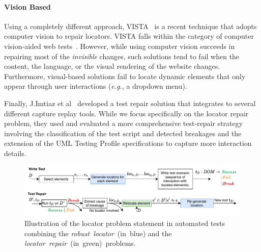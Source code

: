 \documentclass[preprint, 12pt]{elsarticle}
\begin{document}
\paragraph{Vision Based}
Using a completely different approach, VISTA~\cite{stocco2018visual} is a recent technique that adopts computer vision to repair locators. VISTA falls within the category of computer vision-aided web tests~\cite{chang2010gui,leotta2018pesto,alegroth2013jautomate}.
However, while using computer vision succeeds in repairing most of the \textit{invisible} changes, such solutions tend to fail when the content, the language, or the visual rendering of the website changes.
Furthermore, visual-based solutions fail to locate dynamic elements that only appear through user interactions (\emph{e.g.}, a dropdown menu).

Finally, J.Imtiaz et al~\cite{imtiaz2021automated} developed a test repair
solution that integrates to several different capture replay tools. While we
focus specifically on the locator repair problem, they used and evaluated a more
comprehensive test-repair strategy involving the classification of the test script and
detected breakages and the extension of the UML Testing Profile specifications to
capture more interaction details.


\begin{figure}
    \centering
    \includegraphics[width=1\linewidth]{locator-repair}
    \caption{Illustration of the locator problem statement in automated tests combining the \emph{robust~locator}~(in~blue) and the \emph{locator~repair}~(in~green)~problems.}
    \label{fig:locator_repair}
\end{figure} 

\end{document}
